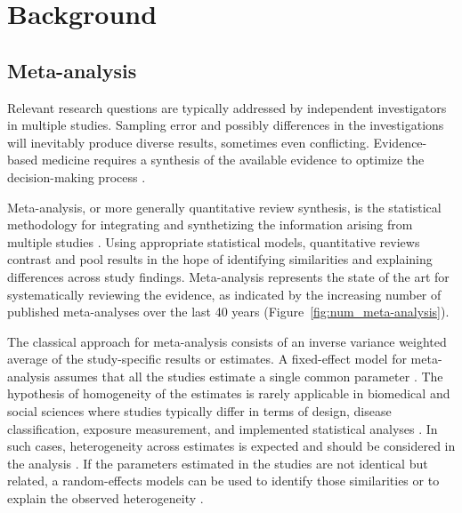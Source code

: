 \documentclass[11pt,a4paper,twoside,openany]{book}\usepackage{knitr}
\begin{document}
{{%
%

\chapter{Background}

\section{Meta-analysis}

Relevant research questions are typically addressed by independent investigators in multiple studies. Sampling error and possibly differences in the investigations will inevitably produce diverse results, sometimes even conflicting. Evidence-based medicine requires a synthesis of the available evidence to optimize the decision-making process \citep{haidich2010meta}. 

Meta-analysis, or more generally quantitative review synthesis, is the statistical methodology for integrating and synthetizing the information arising from multiple studies \citep{borenstein2009references}. Using appropriate statistical models, quantitative reviews contrast and pool results in the hope of identifying similarities and explaining differences across study findings. Meta-analysis represents the state of the art for systematically reviewing the evidence, as indicated by the increasing number of published meta-analyses over the last 40 years (Figure~\ref{fig:num_meta-analysis}).

The classical approach for meta-analysis consists of an inverse variance weighted average of the study-specific results or estimates. A fixed-effect model for meta-analysis assumes that all the studies estimate a single common parameter \citep{rice2017re}. The hypothesis of homogeneity of the estimates is rarely applicable in biomedical and social sciences where studies typically differ in terms of design, disease classification, exposure measurement, and implemented statistical analyses \citep{colditz1995heterogeneity}. In such cases, heterogeneity across estimates is expected and should be considered in the analysis \citep{higgins2008commentary}. If the parameters estimated in the studies are not identical but related, a random-effects models can be used to identify those similarities or to explain the observed heterogeneity \citep{higgins2009re}.

}}
\end{document}
